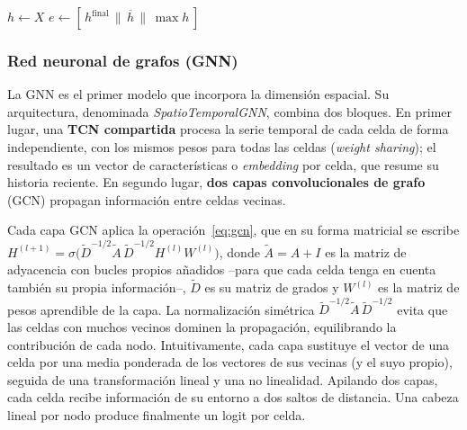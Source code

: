 \begin{algorithm}[ht!]
  \caption{Paso hacia delante de la red convolucional temporal (TCN)}
  \label{alg:tcn}
  \DontPrintSemicolon
  $h \leftarrow X$\;
  $e \leftarrow [\,h^{\text{final}} \,\|\, \overline{h} \,\|\, \max h\,]$ 
\end{algorithm}

\subsubsection{Red neuronal de grafos (GNN)}
\label{md-arq-gnn}

La GNN es el primer modelo que incorpora la dimensión espacial. Su arquitectura,
denominada \textit{SpatioTemporalGNN}, combina dos bloques. En primer lugar, una \textbf{TCN
  compartida} procesa la serie temporal de cada celda de forma independiente, con los mismos
pesos para todas las celdas (\textit{weight sharing}); el resultado es un vector de
características o \textit{embedding} por celda, que resume su historia reciente. En segundo
lugar, \textbf{dos capas convolucionales de grafo} (GCN) propagan información entre celdas
vecinas.

Cada capa GCN aplica la operación~\eqref{eq:gcn}, que en su forma matricial se escribe
\(H^{(l+1)} = \sigma\!\big(\tilde{D}^{-1/2}\tilde{A}\,\tilde{D}^{-1/2} H^{(l)} W^{(l)}\big)\),
donde \(\tilde{A} = A + I\) es la matriz de adyacencia con bucles propios añadidos --para que
cada celda tenga en cuenta también su propia información--, \(\tilde{D}\) es su matriz de
grados y \(W^{(l)}\) es la matriz de pesos aprendible de la capa. La normalización simétrica
\(\tilde{D}^{-1/2}\tilde{A}\,\tilde{D}^{-1/2}\) evita que las celdas con muchos vecinos
dominen la propagación, equilibrando la contribución de cada nodo. Intuitivamente, cada capa
sustituye el vector de una celda por una media ponderada de los vectores de sus vecinas (y el
suyo propio), seguida de una transformación lineal y una no linealidad. Apilando dos capas,
cada celda recibe información de su entorno a dos saltos de distancia. Una cabeza lineal por
nodo produce finalmente un logit por celda.

